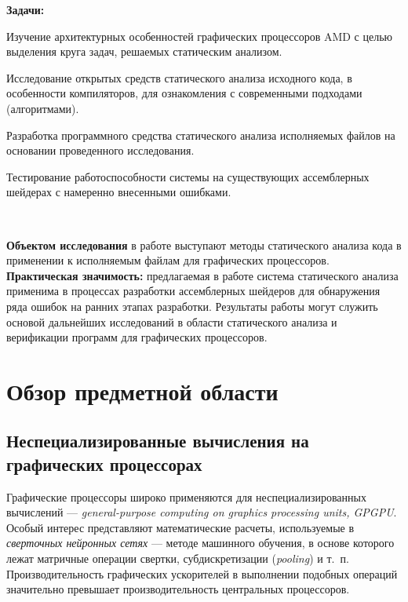 \documentclass[a4paper,14pt]{extarticle}
\begin{document}
\textbf{Задачи:}
\begin{ul}
\item Изучение архитектурных особенностей графических процессоров AMD с целью выделения
круга задач, решаемых статическим анализом.
\item Исследование открытых средств статического анализа исходного кода, в особенности
компиляторов, для ознакомления с современными подходами (алгоритмами).
\item Разработка программного средства статического анализа исполняемых файлов
на основании проведенного исследования.
\item Тестирование работоспособности системы на существующих ассемблерных шейдерах
с намеренно внесенными ошибками.
\end{ul}\ %

\textbf{Объектом исследования} в работе выступают методы статического анализа кода
в применении к исполняемым файлам для графических процессоров.\\

\textbf{Практическая значимость:} предлагаемая в работе система
статического анализа применима в процессах разработки ассемблерных шейдеров
для обнаружения ряда ошибок на ранних этапах разработки. Результаты работы
могут служить основой дальнейших исследований в области статического анализа
и верификации программ для графических процессоров.

\newpage
\section{Обзор предметной области}

\subsection{Неспециализированные вычисления на графических процессорах}

Графические процессоры широко применяются для неспециализированных вычислений —
\textit{general-purpose computing on graphics processing units, GPGPU}.
Особый интерес представляют математические расчеты, используемые в
\textit{сверточных нейронных сетях} — методе машинного обучения, в основе которого
лежат матричные операции свертки, субдискретизации (\textit{pooling}) и т.~п.
Производительность графических ускорителей в выполнении подобных операций
значительно превышает производительность центральных процессоров.\\
\end{document}
